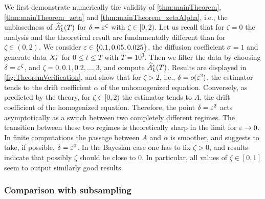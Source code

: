 \documentclass[review,onefignum,onetabnum]{siamonline190516}
\begin{document}
We first demonstrate numerically the validity of \cref{thm:mainTheorem}, \cref{thm:mainTheorem_zeta} and \cref{thm:mainTheorem_zetaAlpha}, i.e., the unbiasedness of $\widehat A^\varepsilon_k(T)$ for $\delta = \varepsilon^\zeta$ with $\zeta \in [0, 2)$. Let us recall that for $\zeta = 0$ the analysis and the theoretical result are fundamentally different than for $\zeta \in (0, 2)$. We consider $\varepsilon \in \{0.1, 0.05, 0.025\}$, the diffusion coefficient $\sigma = 1$ and generate data $X^\varepsilon_t$ for $0 \leq t \leq T$ with $T = 10^3$. Then we filter the data by choosing $\delta = \varepsilon^\zeta$, and $\zeta = 0, 0.1, 0.2,\ldots, 3$, and compute $\widehat A^\varepsilon_k(T)$. Results are displayed in \cref{fig:TheoremVerification}, and show that for $\zeta > 2$, i.e., $\delta = o(\varepsilon^2)$, the estimator tends to the drift coefficient $\alpha$ of the unhomogenized equation. Conversely, as predicted by the theory, for $\zeta \in [0, 2)$ the estimator tends to $A$, the drift coefficient of the homogenized equation. Therefore, the point $\delta = \varepsilon^2$ acts asymptotically as a switch between two completely different regimes. The transition between these two regimes is theoretically sharp in the limit for $\varepsilon \to 0$. In finite computations the passage between $A$ and $\alpha$ is smoother, and suggests to take, if possible, $\delta = \varepsilon^0$. In the Bayesian case one has to fix $\zeta > 0$, and results indicate that possibly $\zeta$ should be close to $0$. In particular, all values of $\zeta \in [0, 1]$ seem to output similarly good results.


\subsubsection{Comparison with subsampling}\label{sec:Num_Param2}
\end{document}
